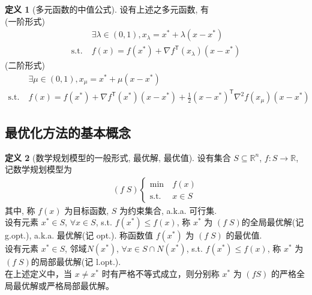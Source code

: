 \documentclass{article}
\theoremstyle{definition}
\newtheorem{definition}{定义}[section]
\theoremstyle{theorem}
\newcommand{\Reals}{\mathbb{R}}
\begin{document}
\begin{definition}[多元函数的中值公式] 设有上述之多元函数, 有 \\
(一阶形式)
\begin{align*}
                  & \exists \lambda \in (0, 1), x_\lambda = x^*+\lambda(x-x^*)\\
\text{s.t.} \; & f(x) = f(x^*) + \nabla f^\mathsf{T}(x_\lambda) (x-x^*)
\end{align*}
(二阶形式)
\begin{align*}
                  & \exists \mu \in (0, 1), x_\mu = x^*+\mu(x-x^*)\\
\text{s.t.} \; & f(x) = f(x^*) + \nabla f^\mathsf{T}(x^*) (x-x^*) + \frac{1}{2} (x-x^*)^\mathsf{T} \nabla^2 f(x_\mu) (x-x^*)
\end{align*}
\end{definition}

\clearpage

\subsection{最优化方法的基本概念}

\begin{definition}[数学规划模型的一般形式, 最优解, 最优值] 设有集合 \( S \subseteq \Reals^n \), \( f:S \rightarrow \Reals \), 记数学规划模型为
\begin{align*}
(f\;S) \begin{cases}
\text{min} \:  & f(x) \\
\text{s.t.} \: & x \in S
\end{cases}
\end{align*}
其中, 称 \( f(x) \) 为目标函数, \( S \) 为约束集合, a.k.a. 可行集. \\
设有元素 \( x^* \in S \), \( \forall x \in S \), s.t. \( f(x^*) \leq f(x)\), 称 \( x^* \) 为 \( (f\;S) \)的全局最优解(记 g.opt.), a.k.a. 最优解(记 opt.). 称函数值 \( f(x^*) \) 为 \( (f\;S) \) 的最优值. \\
设有元素 \( x^* \in S \), 邻域\( N(x^*) \), \( \forall x \in S \cap N(x^*) \), s.t. \( f(x^*) \leq f(x)\), 称 \( x^* \) 为 \( (f\;S) \)的局部最优解(记 l.opt.). \\
在上述定义中，当 \( x \neq x^* \) 时有严格不等式成立，则分别称 \( x^* \) 为 \( (f S) \) 的严格全局最优解或严格局部最优解。
\end{definition}
\end{document}

